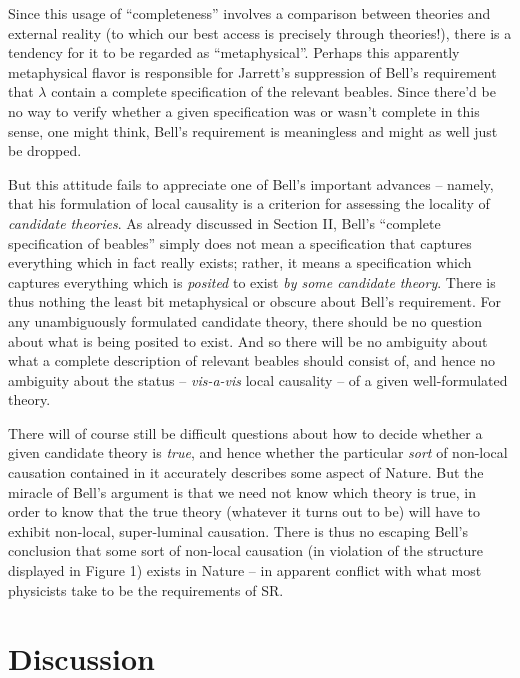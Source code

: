\documentclass[12pt]{article}
\begin{document}
Since this usage of ``completeness'' involves a comparison between
theories and external reality (to which our best access is precisely
through theories!), there is a tendency for it to be regarded as
``metaphysical''.  
Perhaps this apparently metaphysical flavor is
responsible for Jarrett's suppression of
Bell's requirement that $\lambda$ contain a complete specification of
the relevant beables.  Since there'd be no way to verify whether a given
specification was or wasn't complete in this sense, one might think,
Bell's requirement is meaningless and might as well just be dropped.  

But this attitude fails to appreciate one of 
Bell's important advances -- namely, that his formulation of local
causality is a criterion for assessing the locality of \emph{candidate
  theories}.  As already discussed in Section II, Bell's ``complete
specification of beables'' simply does not mean a specification that
captures everything which in fact really exists; rather, it means a
specification which captures everything which is \emph{posited} to
exist \emph{by some candidate theory}.  There is thus nothing the
least bit metaphysical or obscure about Bell's requirement.  For any
unambiguously formulated candidate theory, there should be no question 
about what
is being posited to exist.  And so there will be no ambiguity about
what a complete description of relevant beables should consist of, and
hence no ambiguity about the status -- \emph{vis-a-vis} local
causality  -- of a given well-formulated theory.  

There will of course still be
difficult questions about how to decide whether a given candidate
theory is \emph{true}, and hence whether the particular \emph{sort} of
non-local causation contained in it accurately describes some aspect
of Nature.  But the miracle of Bell's argument is that we
need not know which theory is true, in order to know that the true
theory (whatever it turns out to be) will have to exhibit non-local,
super-luminal causation.  There is thus no escaping Bell's conclusion
that some sort of non-local causation (in violation of the structure
displayed in Figure 1) exists in Nature -- in apparent conflict with
what most physicists take to be the requirements of SR.


\section{Discussion}
\end{document}
